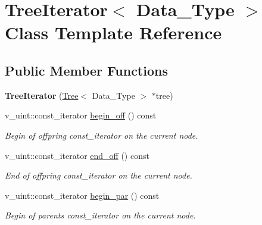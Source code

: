 \hypertarget{classTreeIterator}{}\section{Tree\+Iterator$<$ Data\+\_\+\+Type $>$ Class Template Reference}
\label{classTreeIterator}
\subsection*{Public Member Functions}
\begin{DoxyCompactItemize}
\item 
\mbox{\label{classTreeIterator_a9647a8457ecbaf874cfa2e31d7c991cb}} 
{\bfseries Tree\+Iterator} (\hyperlink{classTree}{Tree}$<$ Data\+\_\+\+Type $>$ $\ast$tree)
\item 
\mbox{\label{classTreeIterator_a62f1df4b367b17878bbcb0a0b9f22d07}} 
v\+\_\+uint\+::const\+\_\+iterator \hyperlink{classTreeIterator_a62f1df4b367b17878bbcb0a0b9f22d07}{begin\+\_\+off} () const
\begin{DoxyCompactList}\small\item\em Begin of offpring {\ttfamily const\+\_\+iterator} on the current node. \end{DoxyCompactList}\item 
\mbox{\label{classTreeIterator_aecb961100ba67fd69ee7e3c9f0835e22}} 
v\+\_\+uint\+::const\+\_\+iterator \hyperlink{classTreeIterator_aecb961100ba67fd69ee7e3c9f0835e22}{end\+\_\+off} () const
\begin{DoxyCompactList}\small\item\em End of offpring {\ttfamily const\+\_\+iterator} on the current node. \end{DoxyCompactList}\item 
\mbox{\label{classTreeIterator_ad1435c13e19ed83e6222285753996567}} 
v\+\_\+uint\+::const\+\_\+iterator \hyperlink{classTreeIterator_ad1435c13e19ed83e6222285753996567}{begin\+\_\+par} () const
\begin{DoxyCompactList}\small\item\em Begin of parents {\ttfamily const\+\_\+iterator} on the current node. \end{DoxyCompactList}\item 

\end{DoxyCompactItemize}
